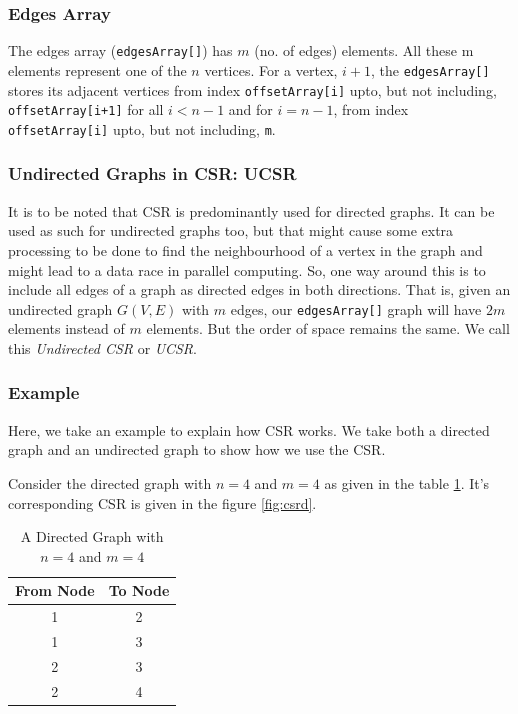 \documentclass[MTech]{iitmdiss}
\begin{document}
\subsubsection{Edges Array}
The edges array (\verb+edgesArray[]+) has $m$ (no. of edges) elements. All these m elements represent one of the $n$ vertices. For a vertex, $i+1$, the \verb+edgesArray[]+ stores its adjacent vertices from index \verb+offsetArray[i]+ upto, but not including, \verb|offsetArray[i+1]| for all $i<n-1$ and for $i=n-1$, from index \verb+offsetArray[i]+ upto, but not including, \verb|m|.
\subsubsection{Undirected Graphs in CSR: UCSR}
It is to be noted that CSR is predominantly used for directed graphs. It can be used as such for undirected graphs too, but that might cause some extra processing to be done to find the neighbourhood of a vertex in the graph and might lead to a data race in parallel computing. So, one way around this is to include all edges of a graph as directed edges in both directions. That is, given an undirected graph $G(V,E)$ with $m$ edges, our \verb+edgesArray[]+ graph will have $2m$ elements instead of $m$ elements. But the order of space remains the same. We call this \textit{Undirected CSR} or \textit{UCSR}.
\subsubsection{Example}
Here, we take an example to explain how CSR works. We take both a directed graph and an undirected graph to show how we use the CSR.

Consider the directed graph with $n=4$ and $m=4$ as given in the table \ref{table:1}. It's corresponding CSR is given in the figure \ref{fig:csrd}.
\begin{table}[h!]
\centering
\begin{tabular}{||c|c||} 
 \hline
 From Node & To Node \\ [0.5ex] 
 \hline\hline
1 & 2\\
\hline
1 & 3\\
\hline
2 & 3\\
\hline
2 & 4\\
 \hline
\end{tabular}
\caption{A Directed Graph with $n=4$ and $m=4$}
\label{table:1}
\end{table}
\end{document}
